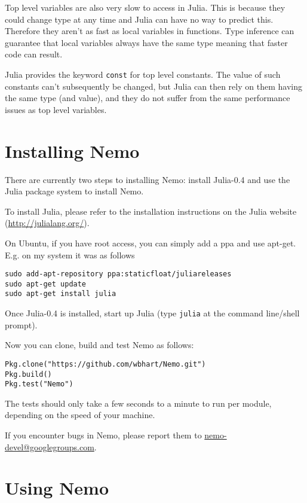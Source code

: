 \documentclass[a4paper,10pt]{article}
\newcommand{\code}{\lstinline}
\begin{document}
Top level variables are also very slow to access in Julia. This is because they could change type at
any time and Julia can have no way to predict this. Therefore they aren't as fast as local variables
in functions. Type inference can guarantee that local variables always have the same type meaning that
faster code can result.

Julia provides the keyword \code{const} for top level constants. The value of such constants can't
subsequently be changed, but Julia can then rely on them having the same type (and value), and they do
not suffer from the same performance issues as top level variables.

\section{Installing Nemo}

There are currently two steps to installing Nemo: install Julia-0.4 and use the Julia
package system to install Nemo.

To install Julia, please refer to the installation instructions on the Julia website
(\url{http://julialang.org/}).

On Ubuntu, if you have root access, you can simply add a ppa and use apt-get. E.g. on
my system it was as follows

\begin{verbatim}
sudo add-apt-repository ppa:staticfloat/juliareleases
sudo apt-get update
sudo apt-get install julia
\end{verbatim}

Once Julia-0.4 is installed, start up Julia (type \code{julia} at the command 
line/shell prompt).

Now you can clone, build and test Nemo as follows:

\begin{verbatim}
Pkg.clone("https://github.com/wbhart/Nemo.git")
Pkg.build()
Pkg.test("Nemo")
\end{verbatim}

The tests should only take a few seconds to a minute to run per module, depending on
the speed of your machine. 

If you encounter bugs in Nemo, please report them to \url{nemo-devel@googlegroups.com}.

\section{Using Nemo}
\end{document}
